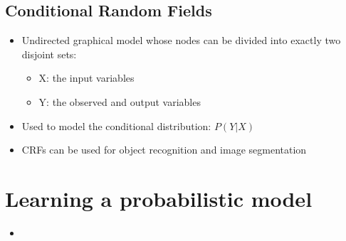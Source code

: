 \documentclass[../main.tex]{subfiles}
\begin{document}
\subsection{Conditional Random Fields}
    \begin{itemize}
      \item Undirected graphical model whose nodes can be divided into exactly two disjoint sets:
      \begin{itemize}
        \item X: the input variables
        \item Y: the observed and output variables
      \end{itemize}
      \item Used to model the conditional distribution: $P(Y|X)$
      \item CRFs can be used for object recognition and image segmentation
    \end{itemize}

\section{Learning a probabilistic model}
    \begin{itemize}
      \item
    \end{itemize}
\end{document}
